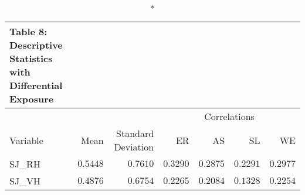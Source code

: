 \begin{longtable}{lrrrrrr}
\caption*{
{\large Table 8: Descriptive Statistics with Differential Exposure}
} \\ 
\toprule
 &  &  & \multicolumn{4}{c}{Correlations} \\ 
\cmidrule(lr){4-7}
Variable & Mean & Standard Deviation & ER & AS & SL & WE \\ 
\midrule
SJ\_RH & $0.5448$ & $0.7610$ & $0.3290$ & $0.2875$ & $0.2291$ & $0.2977$ \\ 
SJ\_VH & $0.4876$ & $0.6754$ & $0.2265$ & $0.2084$ & $0.1328$ & $0.2254$ \\ 
\bottomrule
\end{longtable}

